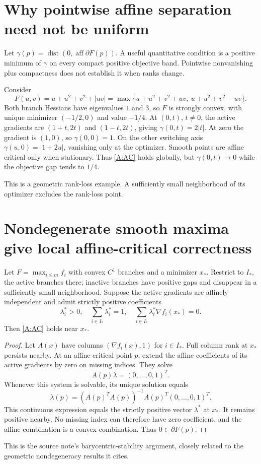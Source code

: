 

\section{Why pointwise affine separation need not be uniform}

Let $\gamma(p)=\operatorname{dist}(0,\operatorname{aff}\partial F(p))$. A useful quantitative condition is a positive minimum of $\gamma$ on every compact positive objective band. Pointwise nonvanishing plus compactness does not establish it when ranks change.

Consider
\[
 F(u,v)=u+u^2+v^2+|uv|
 =\max\{u+u^2+v^2+uv,\ u+u^2+v^2-uv\}.
\]
Both branch Hessians have eigenvalues $1$ and $3$, so $F$ is strongly convex, with unique minimizer $(-1/2,0)$ and value $-1/4$. At $(0,t)$, $t\ne0$, the active gradients are $(1+t,2t)$ and $(1-t,2t)$, giving $\gamma(0,t)=2|t|$. At zero the gradient is $(1,0)$, so $\gamma(0,0)=1$. On the other switching axis $\gamma(u,0)=|1+2u|$, vanishing only at the optimizer. Smooth points are affine critical only when stationary. Thus \eqref{A:AC} holds globally, but $\gamma(0,t)\to0$ while the objective gap tends to $1/4$.

This is a geometric rank-loss example. A sufficiently small neighborhood of its optimizer excludes the rank-loss point.



\section{Nondegenerate smooth maxima give local affine-critical correctness}

Let $F=\max_{i\le m}f_i$ with convex $C^1$ branches and a minimizer $x_*$. Restrict to $I_*$, the active branches there; inactive branches have positive gaps and disappear in a sufficiently small neighborhood. Suppose the active gradients are affinely independent and admit strictly positive coefficients
\[
 \lambda_i^*>0,\quad\sum_{i\in I_*}\lambda_i^*=1,
 \quad\sum_{i\in I_*}\lambda_i^*\nabla f_i(x_*)=0.
\]
Then \eqref{A:AC} holds near $x_*$.

\begin{proof}
Let $A(x)$ have columns $(\nabla f_i(x),1)$ for $i\in I_*$. Full column rank at $x_*$ persists nearby. At an affine-critical point $p$, extend the affine coefficients of its active gradients by zero on missing indices. They solve
\[
 A(p)\lambda=(0,\ldots,0,1)^T.
\]
Whenever this system is solvable, its unique solution equals
\[
 \lambda(p)=(A(p)^TA(p))^{-1}A(p)^T(0,\ldots,0,1)^T.
\]
This continuous expression equals the strictly positive vector $\lambda^*$ at $x_*$. It remains positive nearby. No missing index can therefore have zero coefficient, and the affine combination is a convex combination. Thus $0\in\partial F(p)$.
\end{proof}
This is the source note's barycentric-stability argument, closely related to the geometric nondegeneracy results it cites.

